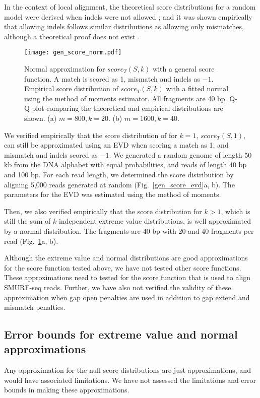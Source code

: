 In the context of local alignment, the theoretical
score distributions for a random model were derived when indels were not
allowed \citep{karlin1990methods,karlin1990statistical}; and it was
shown empirically that allowing indels follows similar distributions as
allowing only mismatches, although a theoretical proof does not exist
\citep{pearson1998empirical,smith1985statistical,altschul199627}.

\begin{figure}[t!]
\centering
\texttt{[image: gen\_score\_norm.pdf]}
\caption[Normal approximation for $score_T(S,k)$ with a general score
  function]{
  Normal approximation for $score_T(S,k)$ with a general score function.
  A match is scored as 1, mismatch and indels as $-1$.
  Empirical score distribution of $score_T(S,k)$ with a fitted
  normal using the method of moments estimator. All fragments are 40 bp.
  Q-Q plot comparing the theoretical and empirical distributions are shown.
  (a) $m=800, k=20$.
  (b) $m=1600, k=40$.}
\label{gen_score_norm}
\end{figure}

We verified empirically that the score distribution of for $k=1$,
$score_T(S,1)$, can still be approximated using an EVD when scoring a
match as 1, and mismatch and indels scored as $-1$. We generated a
random genome of length 50 kb from the DNA alphabet with equal
probabilities, and reads of length 40 bp and 100 bp. For each read
length, we determined the score distribution by aligning 5,000 reads
generated at random (Fig.~\ref{gen_score_evd}a, b). The parameters for
the EVD was estimated using the method of moments.

Then, we also verified empirically that the score distribution for $k >
1$, which is still the sum of $k$ independent extreme value
distributions, is well approximated by a normal distribution. The
fragments are 40 bp with 20 and 40 fragments per read
(Fig.~\ref{gen_score_norm}a, b).


Although the extreme value and normal distributions are good
approximations for the score function tested above, we have not tested
other score functions. These approximations need to tested for the score
function that is used to align SMURF-seq reads. Further, we have also
not verified the validity of these approximation when gap open penalties
are used in addition to gap extend and mismatch penalties.

\subsection*{Error bounds for extreme value and normal approximations}
Any approximation for the null score distributions are just
approximations, and would have associated limitations. We have not
assessed the limitations and error bounds in making these
approximations.

